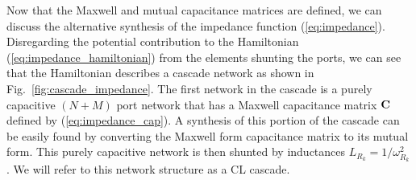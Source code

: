 Now that the Maxwell and mutual capacitance matrices are defined, we can discuss the alternative synthesis of the impedance function (\ref{eq:impedance}). Disregarding the potential contribution to the Hamiltonian (\ref{eq:impedance_hamiltonian}) from the elements shunting the ports, we can see that the Hamiltonian describes a cascade network as shown in Fig.\ \ref{fig:cascade_impedance}. The first network in the cascade is a purely capacitive $(N+M)$ port network that has a Maxwell capacitance matrix $\vb{C}$ defined by (\ref{eq:impedance_cap}). A synthesis of this portion of the cascade can be easily found by converting the Maxwell form capacitance matrix to its mutual form. This purely capacitive network is then shunted by inductances $L_{R_k}=1/\omega_{R_k}^2$. We will refer to this network structure as a CL cascade.

